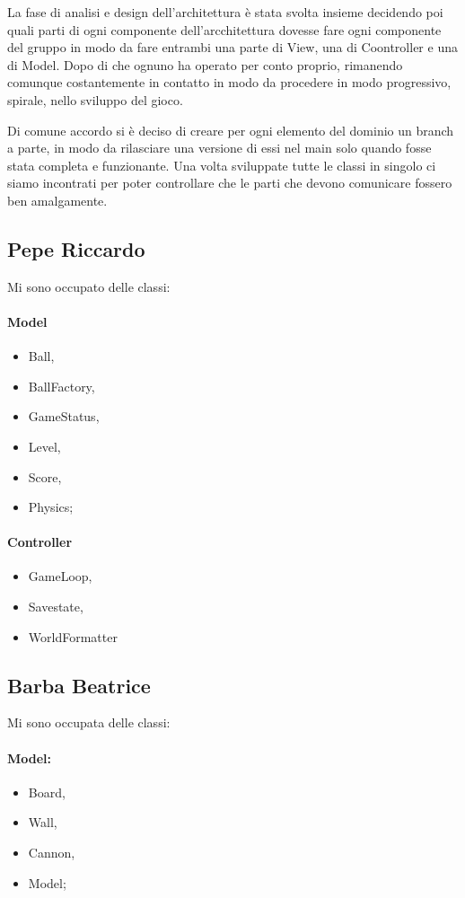 \documentclass[a4paper,12pt]{report}
\begin{document}
La fase di analisi e design dell'architettura è stata svolta insieme decidendo poi quali parti di ogni componente dell'arcchitettura dovesse fare ogni componente del gruppo in modo da fare entrambi una parte di View, una di Coontroller e una di Model. Dopo di che ognuno  ha operato per conto proprio, rimanendo comunque costantemente in contatto in modo da procedere in modo progressivo, spirale, nello sviluppo del gioco. 

Di comune accordo si è deciso di creare per ogni elemento del dominio un branch a parte, in modo da rilasciare una versione di essi nel main solo quando fosse stata completa e funzionante. 
Una volta sviluppate tutte le classi in singolo ci siamo incontrati  per poter controllare che le parti che devono comunicare fossero  ben amalgamente. 

\subsection{Pepe Riccardo}
Mi sono occupato delle classi: 
\paragraph{Model}
\begin{itemize}
\item {Ball,}
\item {BallFactory,}
\item {GameStatus,}
\item {Level,}
\item {Score,}
\item {Physics; }
\end{itemize}    
\paragraph{Controller} 
\begin{itemize}
\item {GameLoop,}
\item {Savestate,}
\item {WorldFormatter}
\end{itemize}  
  
\subsection{Barba Beatrice}
Mi sono occupata delle classi:
\paragraph{Model:} 
\begin{itemize}
\item {Board,}
\item {Wall,}
\item {Cannon,}
\item {Model; }
\end{itemize}
\end{document}
